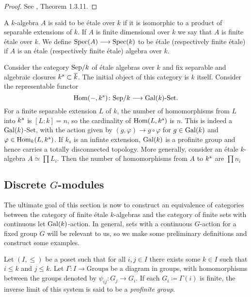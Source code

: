 \begin{proof}
	See \cite{Szamuely}, Theorem 1.3.11.
\end{proof}

\begin{definition}
	A $k$-algebra $A$ is said to be \'etale over $k$ if it is isomorphic to a product of separable extensions of $k$. If $A$ is finite dimensional over $k$ we say that $A$ is finite \'etale over $k$. We define $\operatorname{Spec}(A) \longrightarrow \operatorname{Spec}(k)$ to be \'etale (respectively finite \'etale) if $A$ is an \'etale (respectively finite \'etale) algebra over $k$.
\end{definition}

\begin{construction}\label{construction:separable_category}
	Consider the category $\text{Sep}/k$ of \'etale algebras over $k$ and fix separable and algebraic closures $k^s \subset \overline{k}$. The initial object of this category is $k$ itself. Consider the representable functor
	\[
		\operatorname{Hom}(-, k^s) \colon \text{Sep}/k \longrightarrow \operatorname{Gal}(k)\text{-Set}.
	\]
	For a finite separable extension $L$ of $k$, the number of homomorphisms from $L$ into $k^s$ is $[L:k] = n$, so the cardinality of $\operatorname{Hom}(L, k^s)$ is $n$. This is indeed a $\operatorname{Gal}(k)$-Set, with the action given by $(g, \varphi) \to g \circ \varphi$ for $g \in \operatorname{Gal}(k)$ and $\varphi \in \operatorname{Hom}_k(L, k^s)$. If $k_s$ is an infinte extension, $\operatorname{Gal}(k)$ is a profinite group and hence carries a totally disconnected topology. More generally, consider an \'etale $k$-algebra $A \simeq \prod L_i$. Then the number of homomorphisms from $A$ to $k^s$ are $\prod n_i$
\end{construction}

\subsection{Discrete \texorpdfstring{$G$}{G}-modules}
The ultimate goal of this section is now to construct an equivalence of categories between the category of finite \'etale $k$-algebras and the category of finite sets with continuous let $\operatorname{Gal}(k)$-action. In general, sets with a continuous $G$-action for a fixed group $G$ will be relevant to us, so we make some preliminary definitions and construct some examples.

\begin{definition}
	Let $(I, \le)$ be a poset such that for all $i, j \in I$ there exists some $k \in I$ such that $i \le k$ and $j \le k$. Let $\Gamma \colon I \to \text{Groups}$ be a diagram in groups, with homomorphisms between the groups denoted by $\psi_{ij} \colon G_j \to G_i$. If each $G_i \coloneqq \Gamma(i)$ is finite, the inverse limit of this system is said to be a \textit{profinite group}.
\end{definition}

